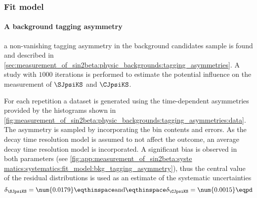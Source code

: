 \subsubsection{Fit model}
\label{sec:measurement_of_sin2beta:systematics:systematics:fit_model}

\paragraph{A background tagging asymmetry} \ie a non-vanishing tagging
asymmetry in the background candidates sample is found and described in
\cref{sec:measurement_of_sin2beta:physic_backgrounds:tagging_asymmetries}. A
\ToyMC study with $\num{1000}$ iterations is performed to estimate the potential
influence on the measurement of $\SJpsiKS$ and $\CJpsiKS$. 

For each repetition a dataset is generated using the time-dependent asymmetries
provided by the histograms shown in
\cref{fig:measurement_of_sin2beta:physic_backgrounds:tagging_asymmetries:data}.
The asymmetry is sampled by incorporating the bin contents and errors. As the
decay time resolution model is assumed to not affect the outcome, an average
decay time resolution model is incorporated. A significant bias is observed in
both \CP parameters (see \cref{fig:app:measurement_of_sin2beta:syste
matics:systematics:fit_model:bkg_tagging_asymmetry}), thus the central value of
the residual distributions is used as an estimate of the systematic
uncertainties
%
\begin{equation}
  \delta_{\SJpsiKS} = \num{0.0179}\eqthinspace\text{and}\eqthinspace\delta_{\CJpsiKS} = \num{0.0015}\eqpd
\end{equation}

